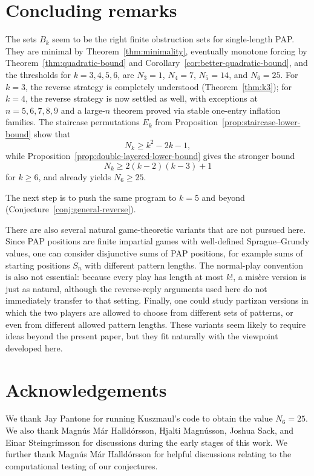 \documentclass[11pt]{amsart}
\newcommand{\Sym}{S}
\theoremstyle{plain}
\theoremstyle{definition}
\theoremstyle{remark}
\begin{document}
\section{Concluding remarks}

The sets $B_k$ seem to be the right finite obstruction sets for single-length PAP\@.  They are
minimal by Theorem~\ref{thm:minimality}, eventually monotone forcing by
Theorem~\ref{thm:quadratic-bound} and Corollary~\ref{cor:better-quadratic-bound}, and the thresholds for
$k=3,4,5,6$, are
$N_3=1$, $N_4=7$, $N_5=14$, and $N_6=25$.  For $k=3$, the reverse strategy is completely understood
(Theorem~\ref{thm:k3}); for $k=4$, the reverse strategy is now settled as well, with
exceptions at $n=5,6,7,8,9$ and a large-$n$ theorem proved via stable one-entry inflation
families.  The staircase permutations $E_k$ from
Proposition~\ref{prop:staircase-lower-bound} show that
\[
  N_k\geq k^2-2k-1,
\]
while Proposition~\ref{prop:double-layered-lower-bound} gives the stronger bound
\[
  N_k\geq 2(k-2)(k-3)+1
\]
for $k \geq 6$, and already yields $N_6 \geq 25$.

The next step is to push the same program to $k=5$ and beyond
(Conjecture~\ref{conj:general-reverse}).

There are also several natural game-theoretic variants that are not pursued here.  Since PAP
positions are finite impartial games with well-defined Sprague--Grundy values, one can consider
disjunctive sums of PAP positions, for example sums of starting positions $\Sym_n$ with different
pattern lengths.  The normal-play convention is also not essential: because every play has length at
most $k!$, a mis\`ere version is just as natural, although the reverse-reply arguments used here do
not immediately transfer to that setting.  Finally, one could study partizan versions in which the
two players are allowed to choose from different sets of patterns, or even from different allowed
pattern lengths.  These variants seem likely to require ideas beyond the present paper, but they fit
naturally with the viewpoint developed here.

\section*{Acknowledgements}

We thank Jay Pantone for running Kuszmaul's code to obtain the value $N_6=25$.  We also thank
Magn\'us M\'ar Halld\'orsson, Hjalti Magn\'usson, Joshua Sack, and Einar Steingr\'imsson for
discussions during the early stages of this work.  We further thank Magn\'us M\'ar Halld\'orsson
for helpful discussions relating to the computational testing of our conjectures.
\end{document}
